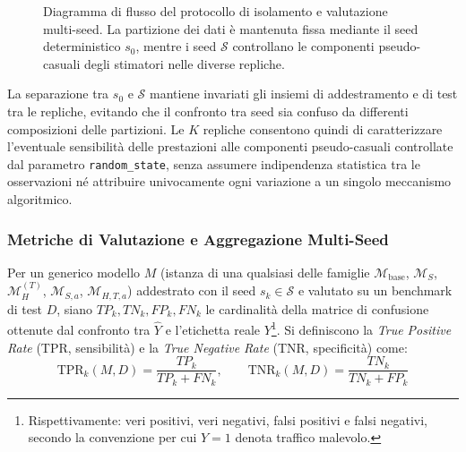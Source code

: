 \begin{figure}[H]
    \caption{Diagramma di flusso del protocollo di isolamento e valutazione multi-seed. La partizione dei dati è mantenuta fissa mediante il seed deterministico $s_0$, mentre i seed $\mathcal{S}$ controllano le componenti pseudo-casuali degli stimatori nelle diverse repliche.}
    \label{fig:multiseed_protocol}
\end{figure}

La separazione tra $s_0$ e $\mathcal{S}$ mantiene invariati gli insiemi di addestramento e di test tra le repliche, evitando che il confronto tra seed sia confuso da differenti composizioni delle partizioni. Le $K$ repliche consentono quindi di caratterizzare l'eventuale sensibilità delle prestazioni alle componenti pseudo-casuali controllate dal parametro \texttt{random\_state}, senza assumere indipendenza statistica tra le osservazioni né attribuire univocamente ogni variazione a un singolo meccanismo algoritmico.

\subsubsection{Metriche di Valutazione e Aggregazione Multi-Seed}
\label{subsubsec:metriche_aggregazione}
Per un generico modello $M$ (istanza di una qualsiasi delle famiglie $\mathcal{M}_{\text{base}}$, $\mathcal{M}_S$, $\mathcal{M}_H^{(T)}$, $\mathcal{M}_{S,a}$, $\mathcal{M}_{H,T,a}$) addestrato con il seed $s_k \in \mathcal{S}$ e valutato su un benchmark di test $D$, siano $TP_k, TN_k, FP_k, FN_k$ le cardinalità della matrice di confusione ottenute dal confronto tra $\hat{Y}$ e l'etichetta reale $Y$\footnote{Rispettivamente: veri positivi, veri negativi, falsi positivi e falsi negativi, secondo la convenzione per cui $Y=1$ denota traffico malevolo.}. Si definiscono la \textit{True Positive Rate} (TPR, sensibilità) e la \textit{True Negative Rate} (TNR, specificità) come:
\begin{equation}
    \text{TPR}_k(M, D) = \frac{TP_k}{TP_k + FN_k}, \qquad \text{TNR}_k(M, D) = \frac{TN_k}{TN_k + FP_k}
    \label{eq:tpr_tnr_def}
\end{equation}

